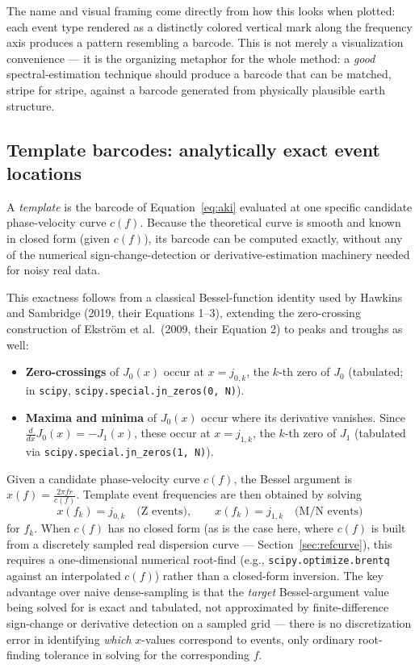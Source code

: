 \documentclass[11pt]{article}
\begin{document}
The name and visual framing come directly from how this looks when plotted: each event type
rendered as a distinctly colored vertical mark along the frequency axis produces a pattern
resembling a barcode. This is not merely a visualization convenience --- it is the organizing
metaphor for the whole method: a \emph{good} spectral-estimation technique should produce a
barcode that can be matched, stripe for stripe, against a barcode generated from physically
plausible earth structure.

\subsection{Template barcodes: analytically exact event locations}
\label{sec:template-barcodes}

A \emph{template} is the barcode of Equation~\ref{eq:aki} evaluated at one specific candidate
phase-velocity curve $c(f)$. Because the theoretical curve is smooth and known in closed form
(given $c(f)$), its barcode can be computed exactly, without any of the numerical
sign-change-detection or derivative-estimation machinery needed for noisy real data.

This exactness follows from a classical Bessel-function identity used by Hawkins and Sambridge
(2019, their Equations 1--3), extending the zero-crossing construction of Ekstr\"om et al.\ (2009,
their Equation 2) to peaks and troughs as well:
\begin{itemize}[nosep]
  \item \textbf{Zero-crossings} of $J_0(x)$ occur at $x = j_{0,k}$, the $k$-th zero of $J_0$
    (tabulated; in \texttt{scipy}, \texttt{scipy.special.jn\_zeros(0, N)}).
  \item \textbf{Maxima and minima} of $J_0(x)$ occur where its derivative vanishes. Since
    $\frac{d}{dx} J_0(x) = -J_1(x)$, these occur at $x = j_{1,k}$, the $k$-th zero of $J_1$
    (tabulated via \texttt{scipy.special.jn\_zeros(1, N)}).
\end{itemize}

Given a candidate phase-velocity curve $c(f)$, the Bessel argument is
$x(f) = \frac{2\pi f r}{c(f)}$. Template event frequencies are then obtained by solving
\begin{equation}
  x(f_k) = j_{0,k} \quad \text{(Z events)}, \qquad x(f_k) = j_{1,k} \quad \text{(M/N events)}
\end{equation}
for $f_k$. When $c(f)$ has no closed form (as is the case here, where $c(f)$ is built from a
discretely sampled real dispersion curve --- Section~\ref{sec:refcurve}), this requires a
one-dimensional numerical root-find (e.g., \texttt{scipy.optimize.brentq} against an interpolated
$c(f)$) rather than a closed-form inversion. The key advantage over naive dense-sampling is that
the \emph{target} Bessel-argument value being solved for is exact and tabulated, not approximated
by finite-difference sign-change or derivative detection on a sampled grid --- there is no
discretization error in identifying \emph{which} $x$-values correspond to events, only ordinary
root-finding tolerance in solving for the corresponding $f$.
\end{document}
